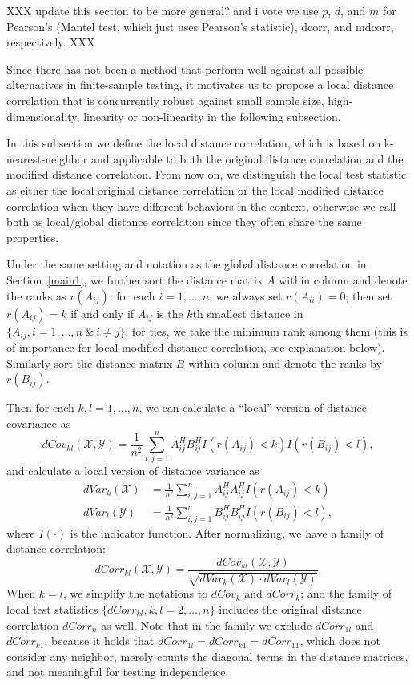 \documentclass[11pt]{article}
\begin{document}
XXX update this section to be more general? 
and i vote we use $p$, $d$, and $m$ for Pearson's (Mantel test, which just uses Pearson's statistic), dcorr, and mdcorr, respectively. 
XXX

Since there has not been a method that perform well against all possible alternatives in finite-sample testing, it motivates us to propose a local distance correlation that is concurrently robust against small sample size, high-dimensionality, linearity or non-linearity in the following subsection.


In this subsection we define the local distance correlation, which is based on k-nearest-neighbor and applicable to both the original distance correlation and the modified distance correlation. From now on, we distinguish the local test statistic as either the local original distance correlation or the local modified distance correlation when they have different behaviors in the context, otherwise we call both as local/global distance correlation since they often share the same properties.

Under the same setting and notation as the global distance correlation in Section~\ref{main1}, we further sort the distance matrix $A$ within column and denote the ranks as $r(A_{ij})$: for each $i=1, \ldots, n$, we always set $r(A_{ii})=0$; then set $r(A_{ij})=k$ if and only if $A_{ij}$ is the $k$th smallest distance in $\{A_{ij}, i=1,\ldots,n\ \& \ i \neq j\}$; for ties, we take the minimum rank among them (this is of importance for local modified distance correlation, see explanation below). Similarly sort the distance matrix $B$ within column and denote the ranks by $r(B_{ij})$.

Then for each $k,l=1,\ldots,n$, we can calculate a ``local'' version of distance covariance as
\begin{equation}
\label{localdCovEqu}
dCov_{kl}(\mathcal{X},\mathcal{Y})=\frac{1}{n^2}\sum_{i,j=1}^{n}A^{H}_{ij}B^{H}_{ij}I(r(A_{ij})<k)I(r(B_{ij})<l),
\end{equation}
and calculate a local version of distance variance as
\begin{align*}
dVar_{k}(\mathcal{X}) &=\frac{1}{n^2}\sum_{i,j=1}^{n}A^{H}_{ij}A^{H}_{ij}I(r(A_{ij})<k)\\
dVar_{l}(\mathcal{Y}) &=\frac{1}{n^2}\sum_{i,j=1}^{n}B^{H}_{ij}B^{H}_{ij}I(r(B_{ij})<l),
\end{align*}
where $I(\cdot)$ is the indicator function. After normalizing, we have a family of distance correlation:
\begin{equation}
\label{localdCorrEqu}
dCorr_{kl}(\mathcal{X},\mathcal{Y})=\frac{dCov_{kl}(\mathcal{X},\mathcal{Y})}{\sqrt{dVar_{k}(\mathcal{X}) \cdot dVar_{l}(\mathcal{Y})}}.
\end{equation}
When $k=l$, we simplify the notations to $dCov_{k}$ and $dCorr_{k}$; and the family of local test statistics $\{dCorr_{kl}, k,l=2,\ldots,n\}$ includes the original distance correlation $dCorr_{n}$ as well. Note that in the family we exclude $dCorr_{1l}$ and $dCorr_{k1}$, because it holds that $dCorr_{1l}=dCorr_{k1}=dCorr_{11}$, which does not consider any neighbor, merely counts the diagonal terms in the distance matrices, and not meaningful for testing independence.
\end{document}
